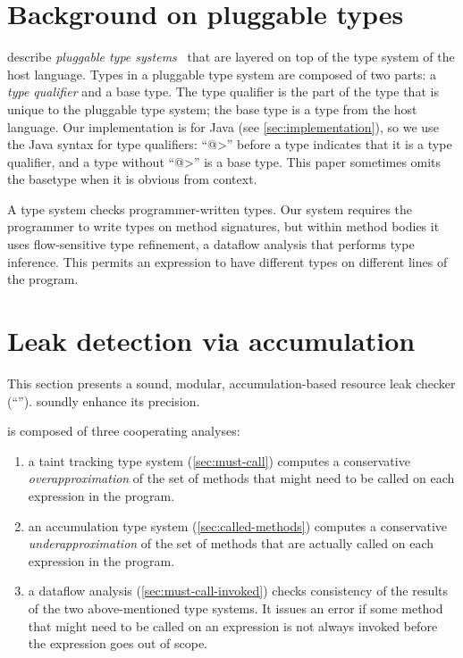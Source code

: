\section{Background on pluggable types}
\label{sec:background}

 describe
\emph{pluggable type systems}~\cite{FosterFFA99}
that are layered on top of the type system of the host
language.  Types in a pluggable type system are composed of two parts:
a \emph{type qualifier} and a base type. The type qualifier is the
part of the type that is unique to the pluggable type system; the base
type is a type from the host language. Our implementation is for Java
(see \cref{sec:implementation}), so we use the Java syntax for type
qualifiers: ``\<@>'' before a type indicates that it is a type
qualifier, and a type without ``\<@>'' is a base type.
This paper sometimes omits the basetype when it is obvious from context.

A type system checks programmer-written types.  Our system requires the
programmer to write types on method signatures, but within method bodies it
uses flow-sensitive type refinement, a dataflow analysis that performs type
inference.  This permits an expression to have different types on different
lines of the program.



\section{Leak detection via accumulation}
\label{sec:base-type-systems}

This section presents a sound, modular, accumulation-based
resource leak checker (``\tool'').
soundly enhance its precision.

\Tool is composed of three cooperating analyses:
\begin{enumerate}
\item a taint tracking type system (\cref{sec:must-call}) computes a conservative
  \emph{overapproximation} of the set of methods that might need to be called
  on each expression in the program.
\item an accumulation type system (\cref{sec:called-methods}) computes
  a conservative \emph{underapproximation} of the set of methods that are
  actually called on each expression in the program.
\item a dataflow analysis (\cref{sec:must-call-invoked}) checks consistency of the results of the two
  above-mentioned type systems.  It issues an error if some
  method that might need to be called on an expression is not always invoked before the
  expression goes out of scope.
\end{enumerate}


